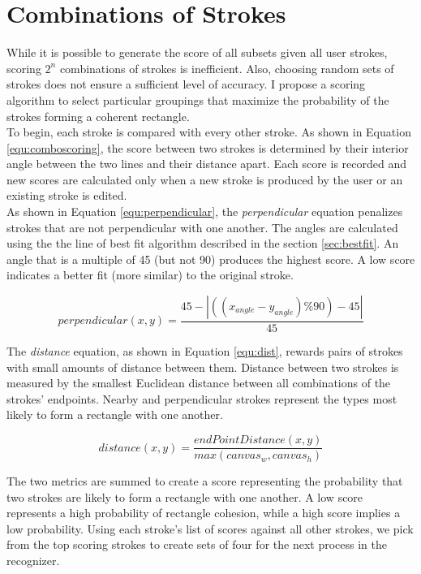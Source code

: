 \section{Combinations of Strokes}
\label{sec:combostrokes}

While it is possible to generate the score of all subsets given all user strokes, scoring $2^n$ combinations of strokes is inefficient. Also, choosing random sets of strokes does not ensure a sufficient level of accuracy. I propose a scoring algorithm to select particular groupings that maximize the probability of the strokes forming a coherent rectangle. \\

To begin, each stroke is compared with every other stroke. As shown in Equation \ref{equ:comboscoring}, the score between two strokes is determined by their interior angle between the two lines and their distance apart. Each score is recorded and new scores are calculated only when a new stroke is produced by the user or an existing stroke is edited. \\

As shown in Equation \ref{equ:perpendicular}, the \textit{perpendicular} equation penalizes strokes that are not perpendicular with one another. The angles are calculated using the the line of best fit algorithm described in the section \ref{sec:bestfit}. An angle that is a multiple of 45 (but not 90) produces the highest score. A low score indicates a better fit (more similar) to the original stroke.

\begin{equation}
\label{equ:perpendicular}
perpendicular(x,y) = \dfrac{45 - |((x_{angle} - y_{angle})\%90) - 45|}{45}
\end{equation}

The \textit{distance} equation, as shown in Equation \ref{equ:dist}, rewards pairs of strokes with small amounts of distance between them. Distance between two strokes is measured by the smallest Euclidean distance between all combinations of the strokes' endpoints. Nearby and perpendicular strokes represent the types most likely to form a rectangle with one another.

\begin{equation}
\label{equ:dist}
distance(x,y) = \dfrac{endPointDistance(x,y)}{max(canvas_{w}, canvas_{h})}
\end{equation}

The two metrics are summed to create a score representing the probability that two strokes are likely to form a rectangle with one another. A low score represents a high probability of rectangle cohesion, while a high score implies a low probability. Using each stroke's list of scores against all other strokes, we pick from the top scoring strokes to create sets of four for the next process in the recognizer.

